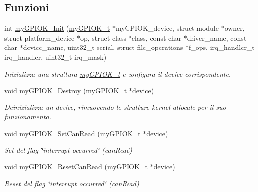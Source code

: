 \subsection*{Funzioni}
\begin{DoxyCompactItemize}
\item 
int \hyperlink{group__my_g_p_i_o_k__t_ga64afb2eff1f990814d792349842c522d}{my\+G\+P\+I\+O\+K\+\_\+\+Init} (\hyperlink{structmy_g_p_i_o_k__t}{my\+G\+P\+I\+O\+K\+\_\+t} $\ast$my\+G\+P\+I\+O\+K\+\_\+device, struct module $\ast$owner, struct platform\+\_\+device $\ast$op, struct class $\ast$class, const char $\ast$driver\+\_\+name, const char $\ast$device\+\_\+name, uint32\+\_\+t serial, struct file\+\_\+operations $\ast$f\+\_\+ops, irq\+\_\+handler\+\_\+t irq\+\_\+handler, uint32\+\_\+t irq\+\_\+mask)
\begin{DoxyCompactList}\small\item\em Inizializza una struttura \hyperlink{structmy_g_p_i_o_k__t}{my\+G\+P\+I\+O\+K\+\_\+t} e configura il device corrispondente. \end{DoxyCompactList}\item 
void \hyperlink{group__my_g_p_i_o_k__t_ga24255b79dd8549aa655cf28c1f9a65d5}{my\+G\+P\+I\+O\+K\+\_\+\+Destroy} (\hyperlink{structmy_g_p_i_o_k__t}{my\+G\+P\+I\+O\+K\+\_\+t} $\ast$device)
\begin{DoxyCompactList}\small\item\em Deinizializza un device, rimuovendo le strutture kernel allocate per il suo funzionamento. \end{DoxyCompactList}\item 
void \hyperlink{group__my_g_p_i_o_k__t_gad82c1051e6acb335b1b26ab0c459453b}{my\+G\+P\+I\+O\+K\+\_\+\+Set\+Can\+Read} (\hyperlink{structmy_g_p_i_o_k__t}{my\+G\+P\+I\+O\+K\+\_\+t} $\ast$device)
\begin{DoxyCompactList}\small\item\em Set del flag \char`\"{}interrupt occurred\char`\"{} (can\+Read) \end{DoxyCompactList}\item 
void \hyperlink{group__my_g_p_i_o_k__t_ga6dc0ec06b388522ffc524e5fd14d8b72}{my\+G\+P\+I\+O\+K\+\_\+\+Reset\+Can\+Read} (\hyperlink{structmy_g_p_i_o_k__t}{my\+G\+P\+I\+O\+K\+\_\+t} $\ast$device)
\begin{DoxyCompactList}\small\item\em Reset del flag \char`\"{}interrupt occurred\char`\"{} (can\+Read) \end{DoxyCompactList}\item 

\end{DoxyCompactItemize}
